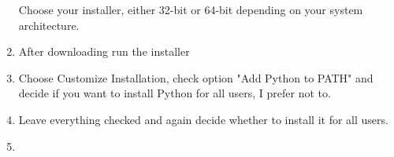 \documentclass[a4paper,12pt]{book}
\begin{document}
\begin{enumerate}
\begin{minipage}[t]{\linewidth}
{		}		
		\medskip	
	\end{minipage}
	Choose your installer, either 32-bit or 64-bit depending on your system architecture.
	\item After downloading run the installer
	\item \begin{minipage}[t]{\linewidth}
		\raggedright
		\medskip	
	\end{minipage}
	Choose Customize Installation, check option "Add Python to PATH" and decide if you want to install Python for all users, I prefer not to.
	\item \begin{minipage}[t]{\linewidth}
		\raggedright
		\medskip	
	\end{minipage}
	Leave everything checked and again decide whether to install it for all users.
	\item \begin{minipage}[t]{\linewidth}
		\raggedright
\end{minipage}
\end{enumerate}
\end{document}
